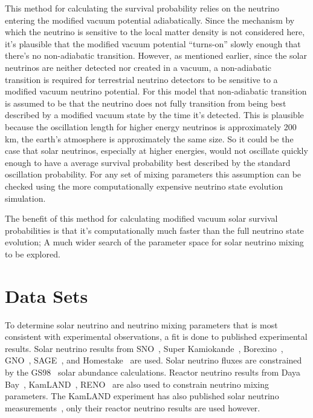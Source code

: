 This method for calculating the survival probability relies
on the neutrino entering the modified vacuum potential adiabatically.
Since the mechanism by which the neutrino is sensitive to the local matter
density is not considered here, it's plausible that the modified
vacuum potential ``turns-on'' slowly enough that there's no non-adiabatic
transition.
However, as mentioned earlier, since the solar neutrinos are neither
detected nor created in a vacuum, a non-adiabatic transition is required
for terrestrial neutrino detectors to be sensitive to a modified vacuum
neutrino potential.
For this model that non-adiabatic transition is assumed to be that the
neutrino does not fully transition from being best described
by a modified vacuum state by the time it's detected.
This is plausible because the oscillation length for higher
energy neutrinos is approximately 200\,km, the earth's atmosphere
is approximately the same size.
So it could be the case that solar neutrinos, especially at higher
energies, would not oscillate quickly enough to have a average
survival probability best described by the standard oscillation
probability.
For any set of mixing parameters this assumption can be checked using the
more computationally expensive neutrino state evolution simulation.

The benefit of this method for calculating modified vacuum solar survival
probabilities is that it's computationally much faster than the full
neutrino state evolution;
A much wider search of the parameter space for solar neutrino
mixing to be explored.

\chapter{Data Sets}
\label{sec:datasets}
To determine solar neutrino and neutrino mixing parameters that is most
consistent with experimental observations, a fit is done to published
experimental results.
Solar neutrino results from SNO~\citep{sno_combined}, Super
Kamiokande~\citep{superk4, superk_first_solar,superk2, superk3},
Borexino~\citep{borexino_final_results,borexino_nature}, GNO~\citep{gallex, gno},
SAGE~\citep{sage}, and Homestake~\citep{homestake} are used.
Solar neutrino fluxes are constrained by the GS98~\citep{gs98} solar abundance calculations.
Reactor neutrino results from Daya Bay~\citep{daya_bay}, KamLAND~\citep{kamland_reactor, kamland_data_release}, RENO~\citep{reno}
are also used to constrain neutrino mixing parameters.
The KamLAND experiment has also published solar neutrino
measurements~\citep{kamland_be7, kamland_b8},
only their reactor neutrino results are used however.


